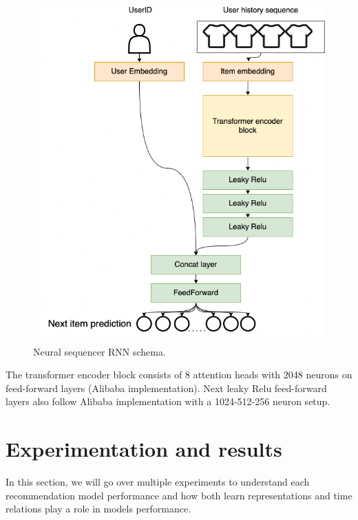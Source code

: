 \documentclass{kththesis}
\begin{document}
\begin{figure}[H]
    \centering
    \includegraphics[scale=0.45]{images/models/Transformer.png}
    \caption{Neural sequencer RNN schema.}
\end{figure}

The transformer encoder block consists of 8 attention heads with 2048 neurons on feed-forward layers (Alibaba implementation). Next leaky Relu feed-forward layers also follow Alibaba implementation with a 1024-512-256 neuron setup.



\chapter{Experimentation and results}\label{results}
In this section, we will go over multiple experiments to understand each recommendation model performance and how both learn representations and time relations play a role in models performance.
\end{document}
